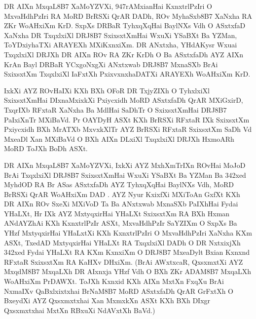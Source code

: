 \ExnoAnSaYZ
{\KXj DR AIXn MxqaL\18B7 XaMoYZVXi, \1947rAMxianHai 
KxnxtrlPzIri O MxvaHdhPzIri RA MoRD
BrRSXi QrAR  DADh, ROv MyhaSxb\18B7 XaNxha RA ZKr WoAHxiXm KrD.  SxpXs DRBaR TyhxqXqHai
BaylNXs Vdh O ASxtxfaD XaNxha DR TxqxlxiXl DRJ\18B7 SxixsxtXmHai WxuXi YSaBXt Ba YZMan, 
ToYDxiyhaTXi ARAYEXh MXiKxnxiXm. DR ANxtxha, YHdAKysr Wxuai TxqxlxiXl DRJXh DR AIXn ROv RA
ZKr KrDh O Ba ASxtxfaDh AYZ AIXn KrAn Bayl DRBaR YCxgoNxgXi ANxtxwab DRJ\18B7 MxnaSXb 
BrAi SxixsxtXm TxqxlxiXl IaFxtXh PxixvxnxhaDATXi ARAYEXh WoAHxiXm KrD.}
%
% 

IxkXi AYZ ROvHaIXi KXh BXh OFoR DR TxjyZIXh O TyhxlxiXl SxixsxtXmHai DIxnaMxixkXi Pxiycxidh MoRD
ASxtxfaDh QrAR MXiGxirD, TxqrIXb RFxtaR XaNxha Ba MdlHai SaDhTr O SxixsxtXmHai DRJ\18B7
PaIxiXnTr MXiBaVd.  Pr OAYDyH ASXt KXh BrRSXi RFxtaR IXk SxixsxtXm Pxiycxidh BXh MrATXb MxvxkXlTr 
AYZ BrRSXi RFxtaR SxixsxtXm SaDh Vd MxeaDl Xan MXiBaVd O BXh AIXn DLxiXl TxqxlxiXl DRJXh
HxmoARh MoRD ToJXh BoDh ASXt. 

DR AIXn MxqaL\18B7 XaMoYZVXi, 
IxkXi AYZ MxhXmTrIXn ROvHai MoJoD BrAi TxqxlxiXl DRJ\18B7 SxixsxtXmHai
WxuXi YSaBXt Ba YZMan Ba \1342xed MyhdOD RA Br ASas ASxtxfaDh AYZ TyhxqXqHai BaylNXs 
Vdh, MoRD BrRSXi QrAR WoAHxiXm DAD 
.
AYZ Nyur KxixfXi MXiToAn GxfXt KXh DR AIXn ROv SxeXi MXiVoD Ta Ba ANxtxwab MxnaSXb PaIXhHai
Fydai YHaLXt, Hr IXk AYZ MxtyqxirHai YHaLXt SxixsxtXm RA BXh Hxman ANdAYZhAi KXh KxnxtrlPzIr
ASXt, MxvaHdhPzIr SaYZIXm O SxpXs Ba YHzf MxtyqxirHai YHaLxtXi KXh KxnxtrlPzIri O 
MxvaHdhPzIri XaNxha KXm ASXt, TxedAD MxtyqxirHai YHaLXt RA TxqxlxiXl DADh O DR NxtxixjXh \1342xed
Fydai YHaLXt RA KXm KxnxiXm O DRJ\18B7 MxeaDylt Bxian Kxnxnd RFxtaR SxixsxtXm RA KaHXv DHxiXm.
{\TaKxid (BrAi AWxtxcaR, QxsxmxtXi AYZ MxqdM\18B7 MxqaLXh DR AIxnxja YHzf Vdh O
BXh ZKr ADAM\18B7 MxqaLXh WoAHxiXm PrDAWXt. ToJXh Kxnxid KXh AIXn MxtXn FxqXu BrAi
NxmaIXv QaBxlxixtxhai BrNaM\18B7 \ylTXkFaRSXi{} MoRD ASxtxfaDh QrAR GrFxtXh O BxeydXi
AYZ Qxsxmxtxhai Xan MxmxkXn ASXt KXh BXh DIxgr Qxsxmxtxhai MxtXn RBxuXi NdAVxtXh BaVd.)}

